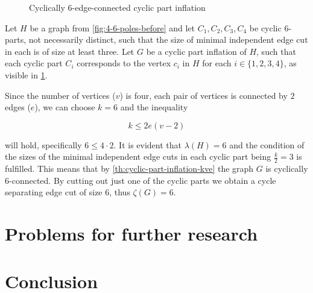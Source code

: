 \documentclass[12pt, twoside]{book}
\begin{document}
\begin{example}
\begin{figure}
		\label{fig:4-6-poles-inflation}
		\caption{Cyclically 6-edge-connected cyclic part inflation}
	\end{figure}


	Let $H$ be a graph from \cref{fig:4-6-poles-before} and let $C_1,C_2,C_3,C_4$ be cyclic 6-parts, not necessarily distinct, such that the size of minimal independent edge cut in each is of size at least three. Let $G$ be a cyclic part inflation of $H$, such that each cyclic part $C_i$ corresponds to the vertex $c_i$ in $H$ for each $i\in\{1,2,3,4\}$, as visible in \cref{fig:4-6-poles-inflation}.
	
	Since the number of vertices ($v$) is four, each pair of vertices is connected by $2$ edges ($e$), we can choose $k=6$ and the inequality 
	
	$$k\leq 2e(v-2)$$
	
	will hold, specifically $6\leq 4\cdot 2$. It is evident that $\lambda(H)=6$ and the condition of the sizes of the minimal independent edge cuts in each cyclic part being $\frac{k}{2}=3$ is fulfilled. This means that by \cref{th:cyclic-part-inflation-kve} the graph $G$ is cyclically 6-connected. By cutting out just one of the cyclic parts we obtain a cycle separating edge cut of size 6, thus $\zeta(G)=6$.
\end{example}


\chapter{Problems for further research}

\todo{}

\chapter*{Conclusion}

\newpage
\thispagestyle{empty}




\end{document}
